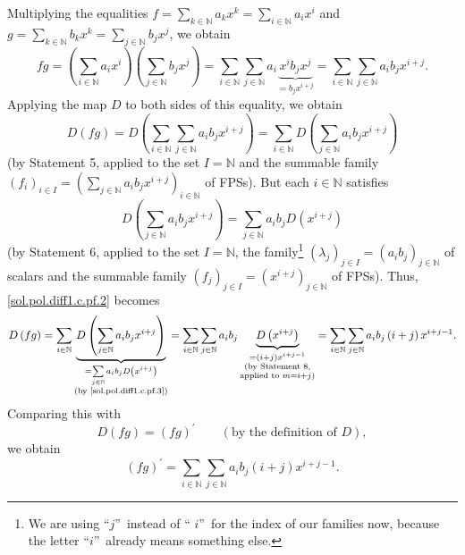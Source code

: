 \documentclass[paper=a4, fontsize=12pt]{scrartcl}%
\let\sumnonlimits\sum
\renewcommand{\sum}{\sumnonlimits\limits}
\theoremstyle{plainsl}
\theoremstyle{definition}
\theoremstyle{remark}
\begin{document}
Multiplying the equalities $f=\sum_{k\in\mathbb{N}}a_{k}x^{k}=\sum
_{i\in\mathbb{N}}a_{i}x^{i}$ and $g=\sum_{k\in\mathbb{N}}b_{k}x^{k}=\sum
_{j\in\mathbb{N}}b_{j}x^{j}$, we obtain%
\begin{equation}
fg=\left(  \sum_{i\in\mathbb{N}}a_{i}x^{i}\right)  \left(  \sum_{j\in
\mathbb{N}}b_{j}x^{j}\right)  =\sum_{i\in\mathbb{N}}\sum_{j\in\mathbb{N}}%
a_{i}\underbrace{x^{i}b_{j}x^{j}}_{=b_{j}x^{i+j}}=\sum_{i\in\mathbb{N}}%
\sum_{j\in\mathbb{N}}a_{i}b_{j}x^{i+j}. \label{sol.pol.diff1.c.pf.1}%
\end{equation}
Applying the map $D$ to both sides of this equality, we obtain%
\begin{equation}
D\left(  fg\right)  =D\left(  \sum_{i\in\mathbb{N}}\sum_{j\in\mathbb{N}}%
a_{i}b_{j}x^{i+j}\right)  =\sum_{i\in\mathbb{N}}D\left(  \sum_{j\in\mathbb{N}%
}a_{i}b_{j}x^{i+j}\right)  \label{sol.pol.diff1.c.pf.2}%
\end{equation}
(by Statement 5, applied to the set $I=\mathbb{N}$ and the summable family
\newline$\left(  f_{i}\right)  _{i\in I}=\left(  \sum_{j\in\mathbb{N}}%
a_{i}b_{j}x^{i+j}\right)  _{i\in\mathbb{N}}$ of FPSs). But each $i\in
\mathbb{N}$ satisfies%
\begin{equation}
D\left(  \sum_{j\in\mathbb{N}}a_{i}b_{j}x^{i+j}\right)  =\sum_{j\in\mathbb{N}%
}a_{i}b_{j}D\left(  x^{i+j}\right)  \label{sol.pol.diff1.c.pf.3}%
\end{equation}
(by Statement 6, applied to the set $I=\mathbb{N}$, the family\footnote{We are
using \textquotedblleft$j$\textquotedblright\ instead of \textquotedblleft%
$i$\textquotedblright\ for the index of our families now, because the letter
\textquotedblleft$i$\textquotedblright\ already means something else.}
$\left(  \lambda_{j}\right)  _{j\in I}=\left(  a_{i}b_{j}\right)
_{j\in\mathbb{N}}$ of scalars and the summable family $\left(  f_{j}\right)
_{j\in I}=\left(  x^{i+j}\right)  _{j\in\mathbb{N}}$ of FPSs). Thus,
\eqref{sol.pol.diff1.c.pf.2} becomes%
\[
D\left(  fg\right)  =\sum_{i\in\mathbb{N}}\underbrace{D\left(  \sum
_{j\in\mathbb{N}}a_{i}b_{j}x^{i+j}\right)  }_{\substack{=\sum_{j\in\mathbb{N}%
}a_{i}b_{j}D\left(  x^{i+j}\right)  \\\text{(by \eqref{sol.pol.diff1.c.pf.3})}%
}}=\sum_{i\in\mathbb{N}}\sum_{j\in\mathbb{N}}a_{i}b_{j}\underbrace{D\left(
x^{i+j}\right)  }_{\substack{=\left(  i+j\right)  x^{i+j-1}\\\text{(by
Statement 8,}\\\text{applied to }m=i+j\text{)}}}=\sum_{i\in\mathbb{N}}%
\sum_{j\in\mathbb{N}}a_{i}b_{j}\left(  i+j\right)  x^{i+j-1}.
\]
Comparing this with
\[
D\left(  fg\right)  =\left(  fg\right)  ^{\prime}\qquad\left(  \text{by the
definition of }D\right)  ,
\]
we obtain%
\begin{equation}
\left(  fg\right)  ^{\prime}=\sum_{i\in\mathbb{N}}\sum_{j\in\mathbb{N}}%
a_{i}b_{j}\left(  i+j\right)  x^{i+j-1}. \label{sol.pol.diff1.c.pf.L=}%
\end{equation}
\end{document}
